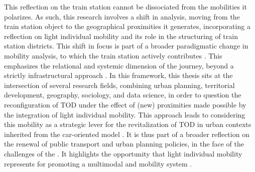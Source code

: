 \begin{refsegment}
This reflection on the train station cannot be dissociated from the mobilities it polarizes. As such, this research involves a shift in analysis, moving from the train station object to the geographical proximities it generates, incorporating a reflection on light individual mobility and its role in the structuring of train station districts. This shift in focus is part of a broader paradigmatic change in mobility analysis, to which the train station actively contributes \textcolor{blue}{\autocite[53]{leheis-guillot_ville_2011}}. This  \textcolor{blue}{\autocites{sheller_new_2006}[8]{sheller_mobilizing_2016}[13]{randell_no_2020}} emphasizes the relational and systemic dimension of the \gls{journey}, beyond a strictly infrastructural approach \textcolor{blue}{\autocite[14]{heran_retour_2015}}. In this framework, this thesis sits at the intersection of several research fields, combining urban planning, territorial development, geography, sociology, and data science, in order to question the reconfiguration of \acrshort{TOD} under the effect of (new) proximities made possible by the integration of light individual mobility. This approach leads to considering this mobility as a strategic lever for the revitalization of \acrshort{TOD} in urban contexts inherited from the car-oriented model \textcolor{blue}{\autocite[209]{heran_retour_2015}}. It is thus part of a broader reflection on the renewal of public transport and urban planning policies, in the face of the challenges of the . It highlights the opportunity that light individual mobility represents for promoting a multimodal and  mobility system \textcolor{blue}{\autocite[979]{lee_bicycle-based_2016}}.%


\end{refsegment}
